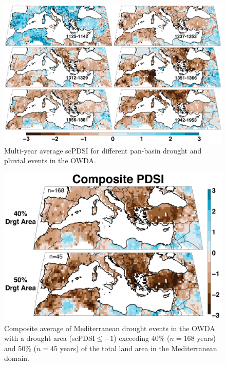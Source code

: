 \documentclass[draft,jgr]{AGUTeX}
\begin{document}
\begin{figure}
\center
\includegraphics[width=1.0\columnwidth]{fig_05_drght_pluv_events.png}
\caption{Multi-year average scPDSI for different pan-basin drought and pluvial events in the OWDA.}\label{placeholder}
\end{figure}

\begin{figure}
\center
\includegraphics[width=0.9\columnwidth]{fig_06_pdsi_40_50_composite.png}
\caption{Composite average of Mediterranean drought events in the OWDA with a drought area (scPDSI$\le-1$) exceeding 40\% ($n=$168 years) and 50\% ($n=$45 years) of the total land area in the Mediterranean domain.}\label{placeholder}
\end{figure}
\end{document}
